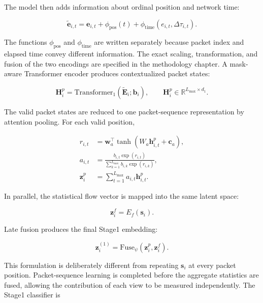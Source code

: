 \documentclass[11pt,fleqn]{report}
\begin{document}
The model then adds information about ordinal position and network time:

\begin{equation}
\widetilde{\mathbf{e}}_{i,t}
=
\mathbf{e}_{i,t}
+\phi_{\mathrm{pos}}(t)
+\phi_{\mathrm{time}}(e_{i,t},\Delta\tau_{i,t}).
\end{equation}

The functions $\phi_{\mathrm{pos}}$ and $\phi_{\mathrm{time}}$ are written
separately because packet index and elapsed time convey different information.
The exact scaling, transformation, and fusion of the two encodings are specified
in the methodology chapter. A mask-aware Transformer encoder
\cite{Vaswani2017} produces contextualized packet states:

\begin{equation}
\mathbf{H}^{p}_i
=
\mathrm{Transformer}_{1}
\left(
    \widetilde{\mathbf{E}}_i;
    \mathbf{b}_i
\right),
\qquad
\mathbf{H}^{p}_i\in\mathbb{R}^{L_{\max}\times d_1}.
\end{equation}

The valid packet states are reduced to one packet-sequence representation by
attention pooling. For each valid position,

\begin{align}
r_{i,t} &=
\mathbf{w}_{a}^{\top}
\tanh(W_a\mathbf{h}^{p}_{i,t}+\mathbf{c}_a),\\
a_{i,t} &=
\frac{
    b_{i,t}\exp(r_{i,t})
}{
    \sum_{k=1}^{L_{\max}}b_{i,k}\exp(r_{i,k})
},\\
\mathbf{z}^{p}_i &=
\sum_{t=1}^{L_{\max}}a_{i,t}\mathbf{h}^{p}_{i,t}.
\end{align}

In parallel, the statistical flow vector is mapped into the same latent space:

\begin{equation}
\mathbf{z}^{f}_i=E_f(\mathbf{s}_i).
\end{equation}

Late fusion produces the final Stage1 embedding:

\begin{equation}
\mathbf{z}^{(1)}_i
=
\mathrm{Fuse}_{\psi}
\left(
    \mathbf{z}^{p}_i,
    \mathbf{z}^{f}_i
\right).
\label{eq:stage1_fusion}
\end{equation}

This formulation is deliberately different from repeating
$\mathbf{s}_i$ at every packet position. Packet-sequence learning is completed
before the aggregate statistics are fused, allowing the contribution of each
view to be measured independently. The Stage1 classifier is
\end{document}
